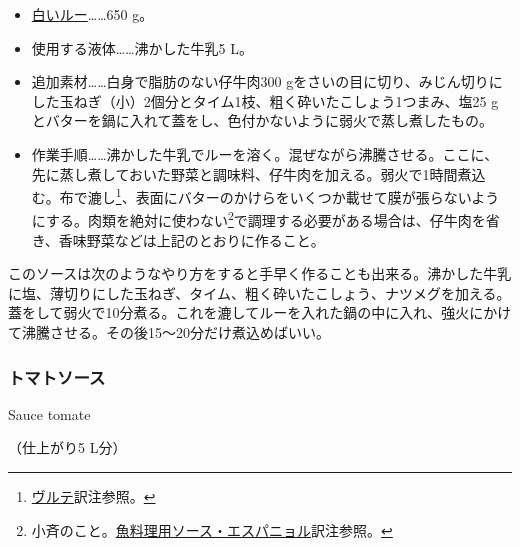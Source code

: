 \begin{recette}
\begin{itemize}
\item
  \protect\hyperlink{roux-blanc}{白いルー}\ldots{}\ldots{}650 g。
\item
  使用する液体\ldots{}\ldots{}沸かした牛乳5 L。
\item
  追加素材\ldots{}\ldots{}白身で脂肪のない仔牛肉300
  gをさいの目に切り、みじん切りにした玉ねぎ（小）2個分とタイム1枝、粗く砕いたこしょう1つまみ、塩25
  g とバターを鍋に入れて蓋をし、色付かないように弱火で蒸し煮したもの。
\item
  作業手順\ldots{}\ldots{}沸かした牛乳でルーを溶く。混ぜながら沸騰させる。ここに、先に蒸し煮しておいた野菜と調味料、仔牛肉を加える。弱火で1時間煮込む。布で漉し\footnote{\protect\hyperlink{veloute}{ヴルテ}訳注参照。}、表面にバターのかけらをいくつか載せて膜が張らないようにする。肉類を絶対に使わない\footnote{小斉のこと。\protect\hyperlink{sauce-espagnole-maigre}{魚料理用ソース・エスパニョル}訳注参照。}で調理する必要がある場合は、仔牛肉を省き、香味野菜などは上記のとおりに作ること。
\end{itemize}

このソースは次のようなやり方をすると手早く作ることも出来る。沸かした牛乳に塩、薄切りにした玉ねぎ、タイム、粗く砕いたこしょう、ナツメグを加える。蓋をして弱火で10分煮る。これを漉してルーを入れた鍋の中に入れ、強火にかけて沸騰させる。その後15〜20分だけ煮込めばいい。

\atoaki{}

\hypertarget{sauce-tomate}{%
\subsubsection{トマトソース}\label{sauce-tomate}}

\begin{frsubenv}

Sauce tomate

\end{frsubenv}

 

（仕上がり5 L分）


\end{recette}
